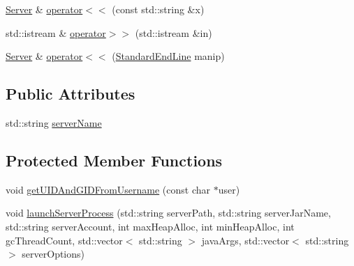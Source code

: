 \begin{DoxyCompactItemize}
\item 
\hyperlink{class_minecraft_server_service_1_1_server}{Server} \& \hyperlink{class_minecraft_server_service_1_1_server_a885bdc0a0267d25168bf6d35086d6090}{operator$<$$<$} (const std\+::string \&x)
\item 
std\+::istream \& \hyperlink{class_minecraft_server_service_1_1_server_a2b2cca8ee2e09c7236bc668e8522cb6a}{operator$>$$>$} (std\+::istream \&in)
\item 
\hyperlink{class_minecraft_server_service_1_1_server}{Server} \& \hyperlink{class_minecraft_server_service_1_1_server_aad73f651ba11cfc4815f8763edd6b914}{operator$<$$<$} (\hyperlink{class_minecraft_server_service_1_1_server_aabd71f679656f27eec9b0d66be40f5a1}{Standard\+End\+Line} manip)
\end{DoxyCompactItemize}
\subsection*{Public Attributes}
\begin{DoxyCompactItemize}
\item 
std\+::string \hyperlink{class_minecraft_server_service_1_1_server_a4a4a359e824e19e2a0c4d105ee4fad91}{server\+Name}
\end{DoxyCompactItemize}
\subsection*{Protected Member Functions}
\begin{DoxyCompactItemize}
\item 
void \hyperlink{class_minecraft_server_service_1_1_server_a085f201bd563ce47e2b41778ef72d20d}{get\+U\+I\+D\+And\+G\+I\+D\+From\+Username} (const char $\ast$user)
\item 
void \hyperlink{class_minecraft_server_service_1_1_server_a16a19b4cfd94f23c20442cea9b46f678}{launch\+Server\+Process} (std\+::string server\+Path, std\+::string server\+Jar\+Name, std\+::string server\+Account, int max\+Heap\+Alloc, int min\+Heap\+Alloc, int gc\+Thread\+Count, std\+::vector$<$ std\+::string $>$ java\+Args, std\+::vector$<$ std\+::string $>$ server\+Options)
\end{DoxyCompactItemize}
